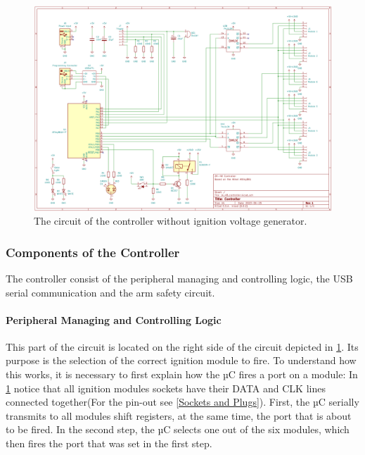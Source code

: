 \begin{figure}[!ht]
    \centering
    \includegraphics[width=15cm]{./Figures/controller_circuit.png}
    \caption{The circuit of the controller without ignition voltage generator.}
    \label{fig:controller_circuit}     
\end{figure}

\pagebreak

\subsubsection{Components of the Controller}
\label{Components of the Controller}
The controller consist of the peripheral managing and controlling logic, the USB serial communication and the arm safety circuit. 

\paragraph{Peripheral Managing and Controlling Logic}
This part of the circuit is located on the right side of the circuit depicted in \cref{fig:controller_circuit}. Its purpose is the selection of the correct ignition module to fire. To understand how this works, it is necessary to first explain how the µC fires a port on a module: In \cref{fig:controller_circuit} notice that all ignition modules sockets have their DATA and CLK lines connected together(For the pin-out see \cref{Sockets and Plugs}). First, the µC serially transmits to all modules shift registers, at the same time, the port that is about to be fired. In the second step, the µC selects one out of the six modules, which then fires the port that was set in the first step.\\

